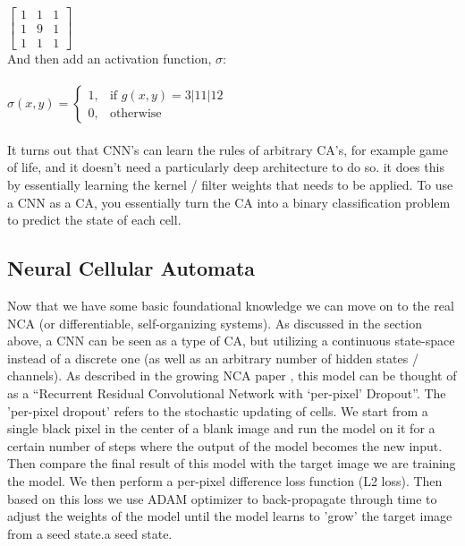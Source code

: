 $
\begin{bmatrix}
	1 & 1 & 1 \\
	1 & 9 & 1 \\
	1 & 1 & 1
\end{bmatrix}
$
\\

And then add an activation function, $\sigma$: \\ \\

$
\sigma(x, y) = \begin{cases}
	1, & \text{if } g(x, y) = 3 | 11 | 12 \\
	0, & \text{otherwise}
\end{cases}
$
\\ \\


It turns out that CNN's can learn the rules of arbitrary CA's, for example game of life, and it doesn't need a particularly deep architecture to do so. it does this by essentially learning the kernel / filter weights that needs to be applied. To use a CNN as a CA, you essentially turn the CA into a binary classification problem to predict the state of each cell.

\subsection{Neural Cellular Automata}

Now that we have some basic foundational knowledge we can move on to the real NCA (or differentiable, self-organizing systems). As discussed in the section above, a CNN can be seen as a type of CA, but utilizing a continuous state-space instead of a discrete one (as well as an arbitrary number of hidden states / channels). As described in the growing NCA paper , this model can be thought of as a “Recurrent Residual Convolutional Network with ‘per-pixel’ Dropout”. The 'per-pixel dropout' refers to the stochastic updating of cells. We start from a single black pixel in the center of a blank image and run the model on it for a certain number of steps where the output of the model becomes the new input. Then compare the final result of this model with the target image we are training the model. We then perform a per-pixel difference loss function (L2 loss). Then based on this loss we use ADAM optimizer to back-propagate through time to adjust the weights of the model until the model learns to 'grow' the target image from a seed state.a seed state.
